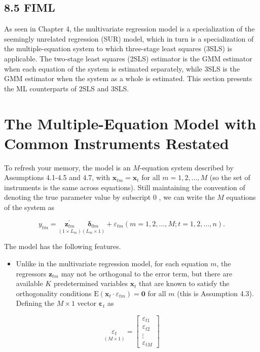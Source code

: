 \documentclass[10pt]{article}
\begin{document}
\subsection*{8.5 FIML}
As seen in Chapter 4, the multivariate regression model is a specialization of the seemingly unrelated regression (SUR) model, which in turn is a specialization of the multiple-equation system to which three-stage least squares (3SLS) is applicable. The two-stage least squares (2SLS) estimator is the GMM estimator when each equation of the system is estimated separately, while 3SLS is the GMM estimator when the system as a whole is estimated. This section presents the ML counterparts of 2SLS and 3SLS.

\section*{The Multiple-Equation Model with Common Instruments Restated}
To refresh your memory, the model is an $M$-equation system described by Assumptions 4.1-4.5 and 4.7, with $\mathbf{x}_{t m}=\mathbf{x}_{t}$ for all $m=1,2, \ldots, M$ (so the set of instruments is the same across equations). Still maintaining the convention of denoting the true parameter value by subscript 0 , we can write the $M$ equations of the system as


\begin{equation*}
y_{t m}=\underset{\left(1 \times L_{m}\right)}{\mathbf{z}_{t m}^{\prime}} \underset{\left(L_{m} \times 1\right)}{\boldsymbol{\delta}_{0 m}}+\varepsilon_{t m}(m=1,2, \ldots, M ; t=1,2, \ldots, n) . \tag{8.5.1}
\end{equation*}


The model has the following features.

\begin{itemize}
  \item Unlike in the multivariate regression model, for each equation $m$, the regressors $\mathbf{z}_{t m}$ may not be orthogonal to the error term, but there are available $K$ predetermined variables $\mathbf{x}_{t}$ that are known to satisfy the orthogonality conditions $\mathrm{E}\left(\mathbf{x}_{t} \cdot \varepsilon_{t m}\right)=\mathbf{0}$ for all $m$ (this is Assumption 4.3). Defining the $M \times 1$ vector $\boldsymbol{\varepsilon}_{t}$ as
\end{itemize}

\[
\underset{(M \times 1)}{\varepsilon_{t}}=\left[\begin{array}{c}
\varepsilon_{t 1}  \tag{8.5.2}\\
\varepsilon_{t 2} \\
\vdots \\
\varepsilon_{t M}
\end{array}\right]
\]
\end{document}
